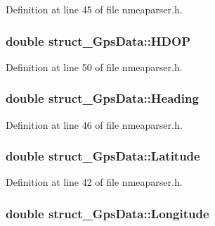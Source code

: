 \-Definition at line 45 of file nmeaparser.\-h.

\hypertarget{group___g_p_s_gadget_plugin_ga7bea5e7cb8f6a97c8b2be703401218e3}{
\subsubsection[{\-H\-D\-O\-P}]{\setlength{\rightskip}{0pt plus 5cm}double {\bf struct\-\_\-\-Gps\-Data\-::\-H\-D\-O\-P}}}\label{group___g_p_s_gadget_plugin_ga7bea5e7cb8f6a97c8b2be703401218e3}


\-Definition at line 50 of file nmeaparser.\-h.

\hypertarget{group___g_p_s_gadget_plugin_ga11eede30f67268e28aac52350a2de20c}{
\subsubsection[{\-Heading}]{\setlength{\rightskip}{0pt plus 5cm}double {\bf struct\-\_\-\-Gps\-Data\-::\-Heading}}}\label{group___g_p_s_gadget_plugin_ga11eede30f67268e28aac52350a2de20c}


\-Definition at line 46 of file nmeaparser.\-h.

\hypertarget{group___g_p_s_gadget_plugin_ga22dd27dba6f143463f812eda429ca6ea}{
\subsubsection[{\-Latitude}]{\setlength{\rightskip}{0pt plus 5cm}double {\bf struct\-\_\-\-Gps\-Data\-::\-Latitude}}}\label{group___g_p_s_gadget_plugin_ga22dd27dba6f143463f812eda429ca6ea}


\-Definition at line 42 of file nmeaparser.\-h.

\hypertarget{group___g_p_s_gadget_plugin_ga63cb298938d490dd35e8a5dbd099f65e}{
\subsubsection[{\-Longitude}]{\setlength{\rightskip}{0pt plus 5cm}double {\bf struct\-\_\-\-Gps\-Data\-::\-Longitude}}}\label{group___g_p_s_gadget_plugin_ga63cb298938d490dd35e8a5dbd099f65e}


